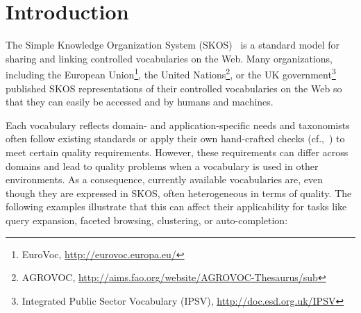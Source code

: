 
\section{Introduction}\label{sec:introduction}


The Simple Knowledge Organization System (SKOS)~\cite{Miles2005} is a standard model for sharing and linking controlled vocabularies on the Web. Many organizations, including the European Union\footnote{EuroVoc, \url{http://eurovoc.europa.eu/}}, the United Nations\footnote{AGROVOC, \url{http://aims.fao.org/website/AGROVOC-Thesaurus/sub}}, or the UK government\footnote{Integrated Public Sector Vocabulary (IPSV), \url{http://doc.esd.org.uk/IPSV}} published SKOS representations of their controlled vocabularies on the Web so that they can easily be accessed and by humans and machines.

Each vocabulary reflects domain- and application-specific needs and taxonomists often follow existing standards \cite{ISO25964-1:2011,Z39.19:2005} or apply their own hand-crafted checks (cf.,~\cite{Coronado2009}) to meet certain quality requirements. However, these requirements can differ across domains and lead to quality problems when a vocabulary is used in other environments. As a consequence, currently available vocabularies are, even though they are expressed in SKOS, often heterogeneous in terms of quality. The following examples illustrate that this can affect their applicability for tasks like query expansion, faceted browsing, clustering, or auto-completion: 

